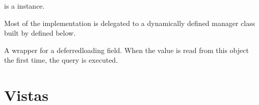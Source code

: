 \documentclass[letterpaper,10pt,spanish]{sphinxmanual}
\begin{document}
\begin{fulllineitems}
\begin{fulllineitems}
\sphinxAtStartPar
{} is a  instance.

\sphinxAtStartPar
Most of the implementation is delegated to a dynamically defined manager
class built by  defined below.

\end{fulllineitems}



\begin{fulllineitems}

\pysigstartsignatures
{}
\pysigstopsignatures
\sphinxAtStartPar
A wrapper for a deferred\sphinxhyphen{}loading field. When the value is read from this
object the first time, the query is executed.

\end{fulllineitems}



\begin{fulllineitems}

\pysigstartsignatures
{}
\pysigstopsignatures
\end{fulllineitems}


\end{fulllineitems}



\section{Vistas}
\label{\detokenize{cenpe:vistas}}
\end{document}
